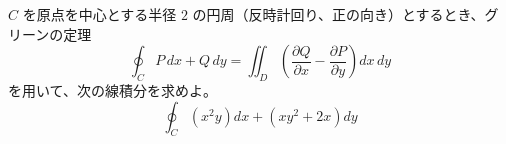 
$C$ を原点を中心とする半径 $2$ の円周（反時計回り、正の向き）とするとき、グリーンの定理
\[
\oint_{C} P\,dx + Q\,dy = \iint_{D} \left(\frac{\partial Q}{\partial x} - \frac{\partial P}{\partial y}\right) dx\,dy
\]
を用いて、次の線積分を求めよ。
\[
\oint_{C} \left(x^{2}y\right) dx + \left(xy^{2} + 2x\right) dy
\]
